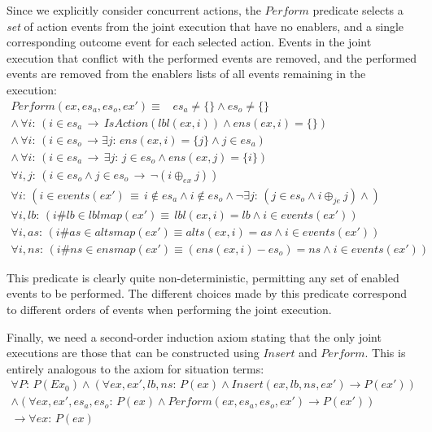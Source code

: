 Since we explicitly consider concurrent actions, the $Perform$ predicate
selects a \emph{set} of action events from the joint execution that
have no enablers, and a single corresponding outcome event for each
selected action. Events in the joint execution that conflict with
the performed events are removed, and the performed events are removed
from the enablers lists of all events remaining in the execution:\begin{gather*}
Perform(ex,es_{a},es_{o},ex')\equiv\,\,\,\,\, es_{a}\neq\{\}\wedge es_{o}\neq\{\}\\
\wedge\,\forall i:\,\left(i\in es_{a}\,\rightarrow\, IsAction(lbl(ex,i))\wedge ens(ex,i)=\{\}\right)\\
\wedge\,\forall i:\,\left(i\in es_{o}\,\rightarrow\exists j:\, ens(ex,i)=\{j\}\wedge j\in es_{a}\right)\\
\wedge\,\forall i:\,\left(i\in es_{a}\,\rightarrow\,\exists j:\, j\in es_{o}\wedge ens(ex,j)=\{i\}\right)\\
\forall i,j:\,\left(i\in es_{o}\wedge j\in es_{o}\,\rightarrow\,\neg(i\oplus_{ex}j)\right)\\
\forall i:\,\left(i\in events(ex')\,\equiv\, i\not\in es_{a}\wedge i\not\in es_{o}\wedge\neg\exists j:\,(j\in es_{o}\wedge i\oplus_{je}j)\wedge\right)\\
\forall i,lb:\,\left(i\#lb\in lblmap(ex')\equiv\, lbl(ex,i)=lb\wedge i\in events(ex')\right)\\
\forall i,as:\,\left(i\#as\in altsmap(ex')\equiv alts(ex,i)=as\wedge i\in events(ex')\right)\\
\forall i,ns:\,\left(i\#ns\in ensmap(ex')\equiv(ens(ex,i)-es_{o})=ns\wedge i\in events(ex')\right)\end{gather*}


This predicate is clearly quite non-deterministic, permitting any
set of enabled events to be performed. The different choices made
by this predicate correspond to different orders of events when performing
the joint execution.

Finally, we need a second-order induction axiom stating that the only
joint executions are those that can be constructed using $Insert$
and $Perform$. This is entirely analogous to the axiom for situation
terms:\begin{multline*}
\forall P:\, P(Ex_{0})\wedge\left(\forall ex,ex',lb,ns:\, P(ex)\wedge Insert(ex,lb,ns,ex')\rightarrow P(ex')\right)\\
\wedge\left(\forall ex,ex',es_{a},es_{o}:\, P(ex)\wedge Perform(ex,es_{a},es_{o},ex')\rightarrow P(ex')\right)\\
\rightarrow\forall ex:\, P(ex)\end{multline*}


